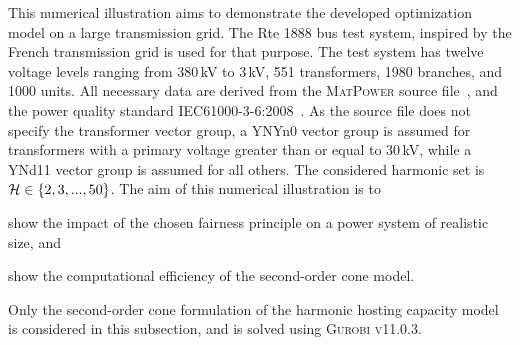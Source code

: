 This numerical illustration aims to demonstrate the developed optimization model on a large transmission grid. The Rte 1888 bus test system, inspired by the French transmission grid is used for that purpose. The test system has twelve voltage levels ranging from 380\,kV to 3\,kV, 551 transformers, 1980 branches, and 1000 units. All necessary data are derived from the \textsc{MatPower} source file~\cite{josz_ac_2016}, and the power quality standard IEC61000-3-6:2008~\cite{noauthor_iec61000-3-6_2008}. As the source file does not specify the transformer vector group, a YNYn0 vector group is assumed for transformers with a primary voltage greater than or equal to 30\,kV, while a YNd11 vector group is assumed for all others. The considered harmonic set is~$\mathcal{H} \in \{2,3,...,50\}$. The aim of this numerical illustration is to 
\begin{enumerate*}
    \item show the impact of the chosen fairness principle on a power system of realistic size, and
    \item show the computational efficiency of the second-order cone model.
\end{enumerate*}
Only the second-order cone formulation of the harmonic hosting capacity model is considered in this subsection, and is solved using \textsc{Gurobi v11.0.3}. 

